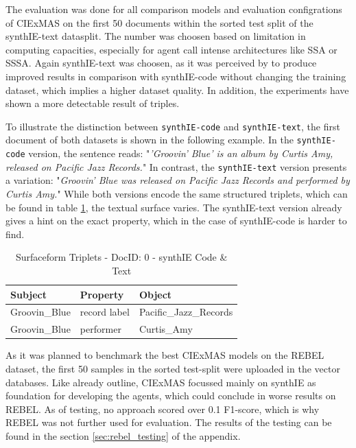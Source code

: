 \documentclass[a4paper,oneside,bibliography=totoc]{scrbook}
\begin{document}
The evaluation was done for all comparison models and evaluation configrations of CIExMAS on the first 50 documents within the sorted test split of the synthIE-text datasplit. The number was choosen based on limitation in computing capacities, especially for agent call intense architectures like \ac{SSA} or \ac{SSSA}. Again synthIE-text was choosen, as it was perceived by \citet{Josifoski2023} to produce improved results in comparison with synthIE-code without changing the training dataset, which implies a higher dataset quality. In addition, the experiments have shown a more detectable result of triples.

To illustrate the distinction between \texttt{synthIE-code} and \texttt{synthIE-text}, the first document of both datasets is shown in the following example. In the \texttt{synthIE-code} version, the sentence reads: "\emph{'Groovin' Blue' is an album by Curtis Amy, released on Pacific Jazz Records.}" In contrast, the \texttt{synthIE-text} version presents a variation: "\emph{Groovin' Blue was released on Pacific Jazz Records and performed by Curtis Amy.}" While both versions encode the same structured triplets, which can be found in table \ref{tab:triple-example}, the textual surface varies. The synthIE-text version already gives a hint on the exact property, which in the case of synthIE-code is harder to find.

\begin{table}[h]
  \centering
  \begin{tabular}{l l l}
    \toprule
    \textbf{Subject} & \textbf{Property} & \textbf{Object}        \\
    \midrule
    Groovin\_Blue    & record label      & Pacific\_Jazz\_Records \\
    Groovin\_Blue    & performer         & Curtis\_Amy            \\
    \bottomrule
  \end{tabular}
  \caption{Surfaceform Triplets - DocID: 0 - synthIE Code \& Text}
  \label{tab:triple-example}
\end{table}

As it was planned to benchmark the best CIExMAS models on the REBEL dataset, the first 50 samples in the sorted test-split were uploaded in the vector databases. Like already outline, CIExMAS focussed mainly on synthIE as foundation for developing the agents, which could conclude in worse results on REBEL. As of testing, no approach scored over 0.1 F1-score, which is why REBEL was not further used for evaluation. The results of the testing can be found in the section \ref{sec:rebel_testing} of the appendix.
\end{document}
